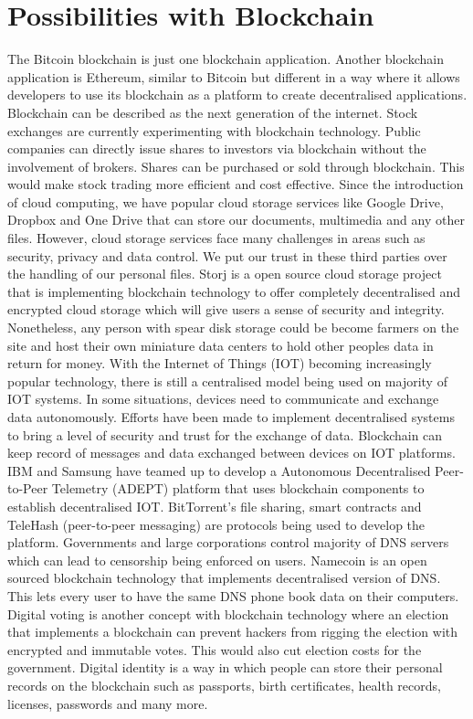 \documentclass[report]{IEEEtran}
\begin{document}
\section{Possibilities with Blockchain}
The Bitcoin blockchain is just one blockchain application. Another blockchain application is Ethereum, similar to Bitcoin but different in a way where it allows developers to use its blockchain as a platform to create decentralised applications. Blockchain can be described as the next generation of the internet. Stock exchanges are currently experimenting with blockchain technology. Public companies can directly issue shares to investors via blockchain without the involvement of brokers. Shares can be purchased or sold through blockchain. This would make stock trading more efficient and cost effective. Since the introduction of cloud computing, we have popular cloud storage services like Google Drive, Dropbox and One Drive that can store our documents, multimedia and any other files. However, cloud storage services face many challenges in areas such as security, privacy and data control. We put our trust in these third parties over the handling of our personal files. Storj is a open source cloud storage project that is implementing blockchain technology to offer completely decentralised and encrypted cloud storage which will give users a sense of security and integrity. Nonetheless, any person with spear disk storage could be become farmers on the site and host their own miniature data centers to hold other peoples data in return for money. With the Internet of Things (IOT) becoming increasingly popular technology, there is still a centralised model being used on majority of IOT systems. In some situations, devices need to communicate and exchange data autonomously. Efforts have been made to implement decentralised systems to bring a level of security and trust for the exchange of data. Blockchain can keep record of messages and data exchanged between devices on IOT platforms. IBM and Samsung have teamed up to develop a Autonomous Decentralised Peer-to-Peer Telemetry (ADEPT) platform that uses blockchain components to establish decentralised IOT. BitTorrent's file sharing, smart contracts and TeleHash (peer-to-peer messaging) are protocols being used to develop the platform. Governments and large corporations control majority of DNS servers which can lead to censorship being enforced on users. Namecoin is an open sourced blockchain technology that implements decentralised version of DNS. This lets every user to have the same DNS phone book data on their computers. Digital voting is another concept with blockchain technology where an election that implements a blockchain can prevent hackers from rigging the election with encrypted and immutable votes. This would also cut election costs for the government. Digital identity is a way in which people can store their personal records on the blockchain such as passports, birth certificates, health records, licenses, passwords and many more. 
\end{document}
